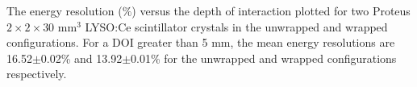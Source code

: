 \label{fig:energyresolution} The energy resolution ($\%$) versus the depth of interaction plotted for two Proteus $2\times2\times30$ mm$^3$ LYSO:Ce scintillator crystals in the unwrapped and wrapped configurations. For a DOI greater than 5 mm, the mean energy resolutions are 16.52$\pm$0.02\% and 13.92$\pm$0.01\% for the unwrapped and wrapped configurations respectively.